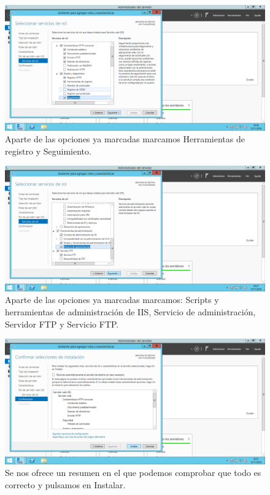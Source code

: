 \begin{flushleft}
\begin{figure}[H]
	\centering
	\includegraphics[scale=0.4]{iis8.png}
	\caption{Aparte de las opciones ya marcadas marcamos Herramientas de registro y Seguimiento.}
\end{figure}

\begin{figure}[H]
	\centering
	\includegraphics[scale=0.4]{iis9.png}
	\caption{Aparte de las opciones ya marcadas marcamos: Scripts y herramientas de administración de IIS, Servicio de
	administración, Servidor FTP y Servicio FTP. }
\end{figure}

\begin{figure}[H]
	\centering
	\includegraphics[scale=0.4]{iis10.png}
	\caption{Se nos ofrece un resumen en el que podemos comprobar que todo es correcto y pulsamos en Instalar.}
\end{figure}



\end{flushleft}
